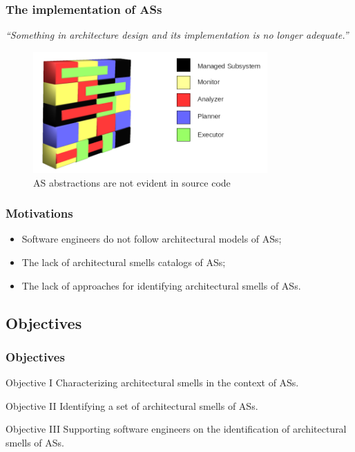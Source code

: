 \begin{frame}\frametitle{The implementation of ASs}

\textit{``Something in architecture design and its implementation is no longer adequate.''} \cite{Zimmermann2017}

\begin{figure}
	\includegraphics[width=0.8\textwidth]{figures/concern.png}
	\caption{AS abstractions are not evident in source code}
\end{figure}

\end{frame}

\begin{frame}\frametitle{Motivations}

\begin{itemize}
	\item Software engineers do not follow architectural models of ASs;
	\vspace{0.5cm}
	\item The lack of architectural smells catalogs of ASs;
	\vspace{0.5cm}
	\item The lack of approaches for identifying architectural smells of ASs.
\end{itemize}

\end{frame}
\subsection{Objectives}
\begin{frame}\frametitle{Objectives}

\begin{block}{Objective I}
	Characterizing architectural smells in the context of ASs.

\end{block}
\vspace{0.5cm}
\pause
\begin{block}{Objective II}
	Identifying a set of architectural smells of ASs. 
\end{block}
\vspace{0.5cm}
\pause

\begin{block}{Objective III}
	Supporting software engineers on the identification of architectural smells of ASs.
\end{block}


\end{frame}

